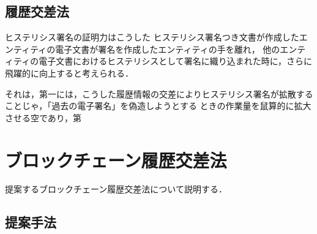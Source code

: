\documentclass[a4paper,12pt]{jsarticle}
\begin{document}





      \subsection{履歴交差法}
ヒステリシス署名の証明力はこうした
ヒステリシス署名つき文書が作成したエンティティの電子文書が署名を作成したエンティティの手を離れ，
他のエンティティの電子文書におけるヒステリシスとして署名に織り込まれた時に，さらに飛躍的に向上すると考えられる．

それは，第一には，こうした履歴情報の交差によりヒステリシス署名が拡散することじゃ，「過去の電子署名」を偽造しようとする
ときの作業量を鼠算的に拡大させる空であり，第

\newpage
\section{ブロックチェーン履歴交差法}
提案するブロックチェーン履歴交差法について説明する．
  \subsection{提案手法}
\label{teian}
\end{document}

